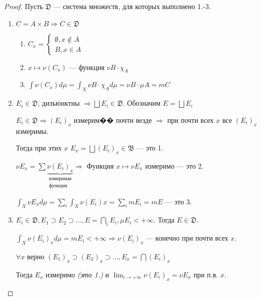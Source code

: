 \begin{proof}
    Пусть \(\mathfrak{D}\) --- система множеств, для которых выполнено 1.-3.

    \begin{enumerate}
        \item \(C = A \times B \Rightarrow C\in \mathfrak{D}\)

              \begin{enumerate}
                  \item \(C_x = \begin{cases}
                            \emptyset, x\notin A \\
                            B, x\in A
                        \end{cases}\)
                  \item \(x \mapsto \nu(C_x)\) --- функция \(\nu B \cdot \chi_A\)
                  \item \(\int \nu(C_x) d\mu = \int_X \nu B \cdot \chi_A d \mu = \nu B \cdot \mu A = mC\)
              \end{enumerate}

        \item \(E_i \in \mathfrak{D}\), дизъюнктны \( \Rightarrow \bigsqcup E_i\in \mathfrak{D}\). Обозначим \(E = \bigsqcup E_i\)

              \(E_i \in \mathfrak{D} \Rightarrow (E_i)_x\) измерим�� почти везде \( \Rightarrow \) при почти всех \(x\) все \((E_i)_x\) измеримы.

              Тогда при этих \(x\) \(E_x = \bigsqcup (E_i)_x \in \mathfrak{B}\) --- это 1.

              \(\nu E_x = \sum \underbrace{\nu(E_i)_x}_{\substack{\text{измеримая} \\ \text{функция}}} \Rightarrow\) Функция \(x \mapsto \nu E_x\) измеримо --- это 2.

              \(\int_X \nu E_x d\mu = \sum_i \int_X \nu(E_i) x = \sum_i m E_i = m E\) --- это 3.

        \item \(E_i \in \mathfrak{D}, E_1 \supset E_2 \supset \dots , E = \bigcap_i E_i, \mu E_i < +\infty\). Тогда \(E\in \mathfrak{D}\).

              \(\int_X \nu(E_i)_x d\mu = m E_i < +\infty \Rightarrow \nu(E_i)_x\) --- конечно при почти всех \(x\).

              \(\forall x\) верно \((E_1)_x \supset (E_2)_x \supset \dots , E_x = \bigcap (E_i)_x\)

              Тогда \(E_x\) измеримо \textit{(это 1.)} и \(\lim_{i \to +\infty} \nu(E_i)_x = \nu E_x\) при п.в. \(x\).


\end{enumerate}
\end{proof}
